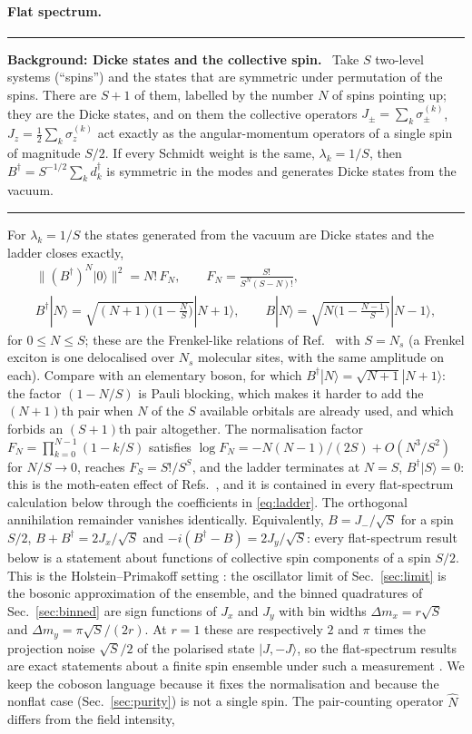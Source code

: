 \documentclass[11pt,a4paper]{article}
\newcommand{\ket}[1]{|#1\rangle}
\newenvironment{background}[1]{\par\medskip\noindent\hrule\smallskip\noindent\textbf{Background: #1.}\ \ignorespaces}{\par\smallskip\noindent\hrule\medskip}
\begin{document}
\paragraph{Flat spectrum.}
\begin{background}{Dicke states and the collective spin}
Take $S$ two-level systems (``spins'') and the states that are symmetric under permutation of the spins. There are $S+1$ of them, labelled by the number $N$ of spins pointing up; they are the Dicke states, and on them the collective operators $J_\pm=\sum_k\sigma_\pm^{(k)}$, $J_z=\frac12\sum_k\sigma_z^{(k)}$ act exactly as the angular-momentum operators of a single spin of magnitude $S/2$. If every Schmidt weight is the same, $\lambda_k=1/S$, then $B^\dagger=S^{-1/2}\sum_kd_k^\dagger$ is symmetric in the modes and generates Dicke states from the vacuum.
\end{background}
For $\lambda_k=1/S$ the states generated from the vacuum are Dicke states and the ladder closes exactly,
\begin{equation}
\begin{gathered}
\|(B^\dagger)^N\ket{0}\|^2=N!\,F_N,\qquad F_N=\frac{S!}{S^N(S-N)!},\\
B^\dagger\ket{N}=\sqrt{(N+1)\Big(1-\tfrac{N}{S}\Big)}\ket{N+1},\qquad
B\ket{N}=\sqrt{N\Big(1-\tfrac{N-1}{S}\Big)}\ket{N-1},
\end{gathered}
\label{eq:ladder}
\end{equation}
for $0\le N\le S$; these are the Frenkel-like relations of Ref.~\cite{Shiau2017} with $S=N_s$ (a Frenkel exciton is one delocalised over $N_s$ molecular sites, with the same amplitude on each). Compare with an elementary boson, for which $B^\dagger\ket N=\sqrt{N+1}\ket{N+1}$: the factor $(1-N/S)$ is Pauli blocking, which makes it harder to add the $(N+1)$th pair when $N$ of the $S$ available orbitals are already used, and which forbids an $(S+1)$th pair altogether. The normalisation factor $F_N=\prod_{k=0}^{N-1}(1-k/S)$ satisfies $\log F_N=-N(N-1)/(2S)+O(N^3/S^2)$ for $N/S\to0$, reaches $F_S=S!/S^S$, and the ladder terminates at $N=S$, $B^\dagger\ket S=0$: this is the moth-eaten effect of Refs.~\cite{Pogosov2010,Shiau2017}, and it is contained in every flat-spectrum calculation below through the coefficients in \eqref{eq:ladder}. The orthogonal annihilation remainder vanishes identically. Equivalently, $B=J_-/\sqrt{S}$ for a spin $S/2$, $B+B^\dagger=2J_x/\sqrt{S}$ and $-i(B^\dagger-B)=2J_y/\sqrt{S}$: every flat-spectrum result below is a statement about functions of collective spin components of a spin $S/2$. This is the Holstein--Primakoff setting \cite{HolsteinPrimakoff1940}: the oscillator limit of Sec.~\ref{sec:limit} is the bosonic approximation of the ensemble, and the binned quadratures of Sec.~\ref{sec:binned} are sign functions of $J_x$ and $J_y$ with bin widths $\Delta m_x=r\sqrt S$ and $\Delta m_y=\pi\sqrt S/(2r)$. At $r=1$ these are respectively $2$ and $\pi$ times the projection noise $\sqrt S/2$ of the polarised state $\ket{J,-J}$, so the flat-spectrum results are exact statements about a finite spin ensemble under such a measurement \cite{Ma2011}. We keep the coboson language because it fixes the normalisation and because the nonflat case (Sec.~\ref{sec:purity}) is not a single spin. The pair-counting operator $\hat N$ differs from the field intensity,
\end{document}
